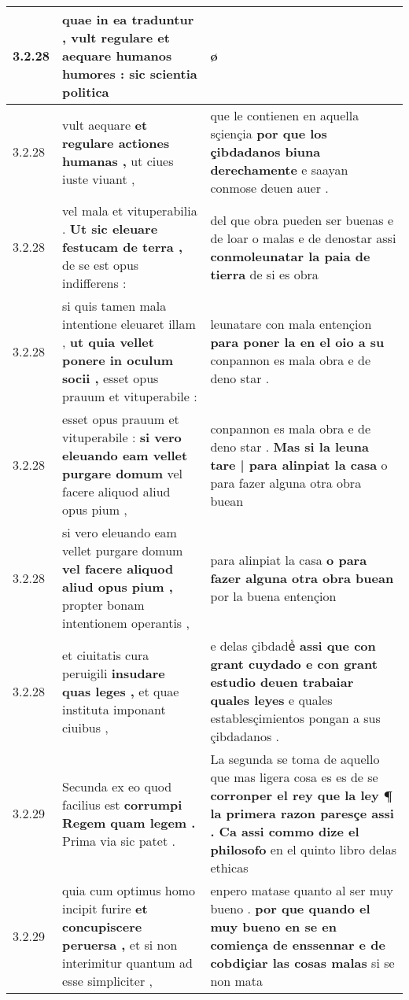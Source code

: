 \begin{tabular}{|p{1cm}|p{6.5cm}|p{6.5cm}|}
3.2.28 & quae in ea traduntur , \textbf{ vult regulare et aequare humanos humores : } sic scientia politica & ø \\\hline
3.2.28 & vult aequare \textbf{ et regulare actiones humanas , } ut ciues iuste viuant , & que le contienen en aquella sçiençia \textbf{ por que los çibdadanos biuna derechamente } e saayan conmose deuen auer . \\\hline
3.2.28 & vel mala et vituperabilia . \textbf{ Ut sic eleuare festucam de terra , } de se est opus indifferens : & del que obra pueden ser buenas e de loar o malas e de denostar assi \textbf{ conmoleunatar la paia de tierra } de si es obra \\\hline
3.2.28 & si quis tamen mala intentione eleuaret illam , \textbf{ ut quia vellet ponere in oculum socii , } esset opus prauum et vituperabile : & leunatare con mala entençion \textbf{ para poner la en el oio a su } conpannon es mala obra e de deno star . \\\hline
3.2.28 & esset opus prauum et vituperabile : \textbf{ si vero eleuando eam vellet purgare domum } vel facere aliquod aliud opus pium , & conpannon es mala obra e de deno star . \textbf{ Mas si la leuna tare | para alinpiat la casa } o para fazer alguna otra obra buean \\\hline
3.2.28 & si vero eleuando eam vellet purgare domum \textbf{ vel facere aliquod aliud opus pium , } propter bonam intentionem operantis , & para alinpiat la casa \textbf{ o para fazer alguna otra obra buean } por la buena entençion \\\hline
3.2.28 & et ciuitatis cura peruigili \textbf{ insudare quas leges , } et quae instituta imponant ciuibus , & e delas çibdadeᷤ \textbf{ assi que con grant cuydado e con grant estudio deuen trabaiar quales leyes } e quales establesçimientos pongan a sus çibdadanos . \\\hline
3.2.29 & Secunda ex eo quod facilius est \textbf{ corrumpi Regem quam legem . } Prima via sic patet . & La segunda se toma de aquello que mas ligera cosa es es de se \textbf{ corronper el rey que la ley ¶ la primera razon paresçe assi . Ca assi commo dize el philosofo } en el quinto libro delas ethicas \\\hline
3.2.29 & quia cum optimus homo incipit furire \textbf{ et concupiscere peruersa , } et si non interimitur quantum ad esse simpliciter , & enpero matase quanto al ser muy bueno . \textbf{ por que quando el muy bueno en se en comiença de enssennar e de cobdiçiar las cosas malas } si se non mata \\\hline

\end{tabular}
